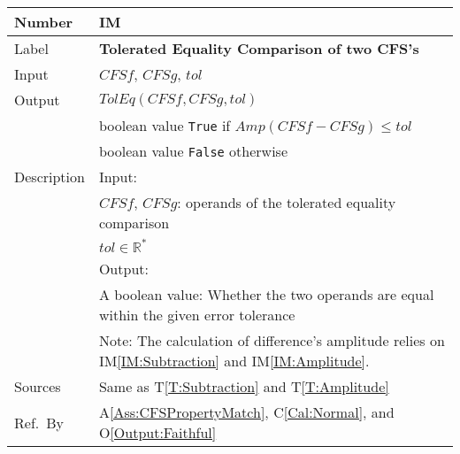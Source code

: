 \documentclass[12pt]{article}
\newcommand{\colAwidth}{0.13\textwidth}
\newcommand{\colBwidth}{0.82\textwidth}
\newcommand{\tref}[1]{T\ref{#1}}
\newcommand{\aref}[1]{A\ref{#1}}
\newcommand{\calref}[1]{C\ref{#1}}
\newcommand{\oref}[1]{O\ref{#1}}
\newcounter{instnum} %
\newcommand{\iref}[1]{IM\ref{#1}}
\begin{document}
\noindent
\begin{minipage}{\textwidth}
       	\renewcommand*{\arraystretch}{1.5}
	\begin{tabular}{| p{\colAwidth} | p{\colBwidth}|}
		\hline
		\rowcolor[gray]{0.9}
		Number& IM{instnum}\theinstnum 
		\label{IM:ToleratedEquality}\\
		\hline
		Label& \bf Tolerated Equality Comparison of two CFS's \\
		\hline
		Input& $\mathit{CFSf}$, $\mathit{CFSg}$, $\mathit{tol}$\\
		\hline
		Output&$\mathit{TolEq}(\mathit{CFSf}, \mathit{CFSg}, \mathit{tol})$\\
		& boolean value \texttt{True} if 
		$\mathit{Amp}(\mathit{CFSf}-\mathit{CFSg})\leq \mathit{tol}$\\
		&boolean value \texttt{False} otherwise\\
		\hline
		Description&Input:\\
		&$\mathit{CFSf}$, $\mathit{CFSg}$: operands of 
		the tolerated equality comparison\\
		&$\mathit{tol}\in\mathbb{R}^{*}$\\
		&Output:\\
		& A boolean value: Whether the two operands are equal 
		within the given error tolerance\\
		&Note: The calculation of difference's amplitude 
		relies on \iref{IM:Subtraction} and \iref{IM:Amplitude}.\\
		\hline
		Sources&Same as \tref{T:Subtraction} and \tref{T:Amplitude}\\
		\hline
		Ref.\ By & \aref{Ass:CFSPropertyMatch}, \calref{Cal:Normal}, 
		and \oref{Output:Faithful}\\
		\hline
	\end{tabular}
\end{minipage}\\
~\newline
\end{document}
